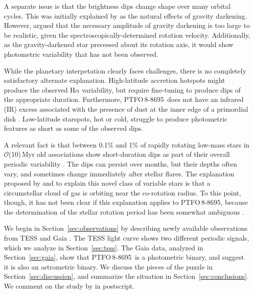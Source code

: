 \documentclass[12pt,twocolumn,tighten]{aastex62}
\newcommand{\ptfo}{PTFO$\,$8-8695}
\begin{document}
A separate issue is that the brightness dips change shape over many
orbital cycles. This was initially explained by
\cite{barnes_measurement_2013} as the natural effects of gravity
darkening.  However, \cite{howarth_reappraisal_2016} argued that the
necessary amplitude of gravity darkening is too large to be realistic,
given the spectroscopically-determined rotation velocity.
Additionally, as the gravity-darkened star precessed about its
rotation axis, it would show photometric variability that has not been
observed.

While the planetary interpetation clearly faces challenges, there is
no completely satisfactory alternate explanation.  High-latitude
accretion hotspots might produce the observed H$\alpha$ variability,
but require fine-tuning to produce dips of the appropriate duration.
Furthermore, \ptfo\ does not have an infrared (IR) excess associated
with the presence of dust at the inner edge of a primordial disk
\citep[{\it e.g.},][Figure~18]{yu_tests_2015}.  Low-latitude
starspots, hot or cold, struggle to produce photometric features as
short as some of the observed dips.

A relevant fact is that between 0.1\% and 1\% of rapidly rotating
low-mass stars in $\mathcal{O}$(10)$\,$Myr old associations show
short-duration dips as part of their overall periodic variability
\citep{rebull_usco_2018}.  The dips can persist over months, but their
depths often vary, and sometimes change immediately after stellar
flares.  The explanation proposed by \citet{stauffer_orbiting_2017}
and \citet{david_transient_2017} to explain this novel class of
variable stars is that a circumstellar cloud of gas is orbiting near
the co-rotation radius.  To this point, though, it has not been clear
if this explanation applies to \ptfo, because the determination of the
stellar rotation period has been somewhat ambiguous
\citep{van_eyken_ptf_2012,koen_multicolour_2015,raetz_yeti_2016}.

We begin in Section~\ref{sec:observations} by describing newly
available observations from TESS \citep{ricker_transiting_2015} and
Gaia \citep{gaia_collaboration_gaia_2018}.  The TESS light curve shows
two different periodic signals, which we analyze in
Section~\ref{sec:tess}.  The Gaia data, analyzed in
Section~\ref{sec:gaia}, show that \ptfo\ is a photometric binary, and
suggest it is also an astrometric binary.  We discuss the pieces of
the puzzle in Section~\ref{sec:discussion}, and summarize the
situation in Section~\ref{sec:conclusions}.  We comment on the study
by \citet{koen_2020} in postscript.
\end{document}

